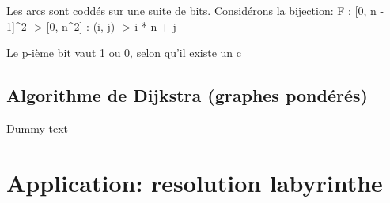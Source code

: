 \documentclass[a4paper,10pt]{article}
\begin{document}
    Les arcs sont coddés sur une suite de bits.
    Considérons la bijection:
	F : [0, n - 1]^2 ->   [0, n^2]
	  :    (i, j)    ->  i * n + j
	
    Le p-ième bit vaut 1 ou 0, selon qu'il existe un c

  \subsection{Algorithme de Dijkstra (graphes pondérés)}

    Dummy text

  \newpage
  \section{Application: resolution labyrinthe}
\end{document}
